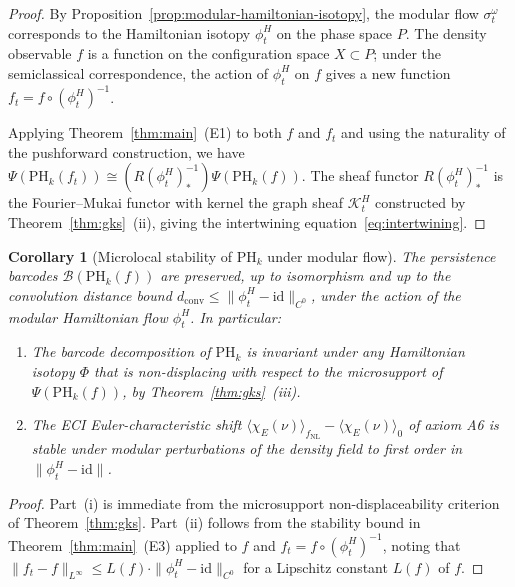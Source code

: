 \documentclass[12pt,a4paper]{amsart}
\newtheorem{corollary}[theorem]{Corollary}
\theoremstyle{definition}
\newcommand{\PHk}{\mathrm{PH}_k}            %
\newcommand{\id}{\mathrm{id}}
\newcommand{\dconv}{d_{\mathrm{conv}}}      %
\begin{document}
\begin{proof}
  By Proposition~\ref{prop:modular-hamiltonian-isotopy}, the modular
  flow $\sigma_t^\omega$ corresponds to the Hamiltonian isotopy $\phi_t^H$
  on the phase space $P$.  The density observable $f$ is a function on
  the configuration space $X \subset P$; under the semiclassical
  correspondence, the action of $\phi_t^H$ on $f$ gives a new function
  $f_t = f \circ (\phi_t^H)^{-1}$.

  Applying Theorem~\ref{thm:main}~(E1) to both $f$ and $f_t$ and using
  the naturality of the pushforward construction, we have
  $\Psi(\PHk(f_t)) \cong (R(\phi_t^H)^{-1}_*) \Psi(\PHk(f))$.
  The sheaf functor $R(\phi_t^H)^{-1}_*$ is the Fourier--Mukai functor
  with kernel the graph sheaf $\mathcal{K}^H_t$ constructed by
  Theorem~\ref{thm:gks}~(ii), giving the intertwining
  equation~\eqref{eq:intertwining}.
\end{proof}

\begin{corollary}[Microlocal stability of $\PHk$ under modular flow]
  \label{cor:microlocal-stability}
  The persistence barcodes $\mathcal{B}(\PHk(f))$ are preserved, up to
  isomorphism and up to the convolution distance bound
  $\dconv \leq \|\phi_t^H - \id\|_{C^0}$, under the action of the
  modular Hamiltonian flow $\phi_t^H$.  In particular:
  \begin{enumerate}
    \item[(i)]
      The barcode decomposition of $\PHk$ is invariant under any
      Hamiltonian isotopy $\Phi$ that is non-displacing with respect to
      the microsupport of $\Psi(\PHk(f))$, by
      Theorem~\ref{thm:gks}~(iii).
    \item[(ii)]
      The ECI Euler-characteristic shift $\langle \chi_E(\nu)
      \rangle_{f_\mathrm{NL}} - \langle \chi_E(\nu) \rangle_0$ of axiom A6
      is stable under modular perturbations of the density field to
      first order in $\|\phi_t^H - \id\|$.
  \end{enumerate}
\end{corollary}

\begin{proof}
  Part~(i) is immediate from the microsupport non-displaceability
  criterion of Theorem~\ref{thm:gks}.  Part~(ii) follows from the
  stability bound in Theorem~\ref{thm:main}~(E3) applied to $f$ and
  $f_t = f \circ (\phi_t^H)^{-1}$, noting that
  $\|f_t - f\|_{L^\infty} \leq L(f) \cdot \|\phi_t^H - \id\|_{C^0}$
  for a Lipschitz constant $L(f)$ of $f$.
\end{proof}
\end{document}
